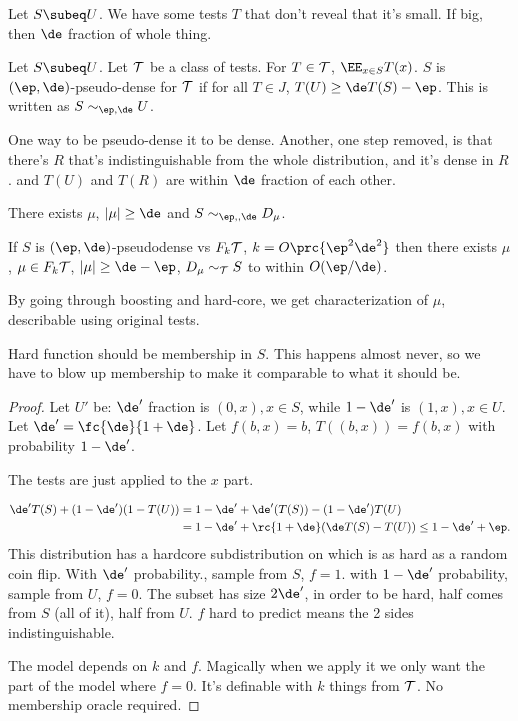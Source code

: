 Let $S\subeq U$. We have some tests $T$ that don't reveal that it's small. If big, then $\de$ fraction of whole thing.
\begin{df}
Let $S\subeq U$. Let $\cal T$ be a class of tests. For $T\in \cal T$, $\EE_{x\in S} T(x)$. 
$S$ is $(\ep,\de)$-pseudo-dense for $\cal T$ if for all $T\in J$, $T(U) \ge \de T(S) - \ep$.  This is written as $S\sim_{\ep,\de} U$.
\end{df}
One way to be pseudo-dense it to be dense. Another, one step removed,  is that there's $R$ that's indistinguishable from the whole distribution, and it's dense in $R$. and $T(U)$ and $T(R)$ are within $\de$ fraction of each other. 
\begin{thm}
There exists $\mu$, $|\mu|\ge \de$ and $S \sim_{\ep,,\de} D_\mu$. 

If $S$ is $(\ep,\de)$-pseudodense vs $F_k\cal T$, $k=O\prc{\ep^2\de^2}$ then there exists $\mu$, $\mu\in F_k\cal T$, $|\mu|\ge \de-\ep$, $D_\mu\sim_{\cal T} S$ to within $O(\ep/\de)$. 
\end{thm}
By going through boosting and hard-core, we get characterization of $\mu$, describable using original tests.

Hard function should be membership in $S$. This happens almost never, so we have to blow up membership to make it comparable to what it should be.
\begin{proof}
Let $U'$ be: $\de'$ fraction is $(0,x), x\in S$, while $1-\de'$ is $(1,x), x\in U$.  Let $\de'=\fc{\de}{1+\de}$.  Let $f(b,x)=b$, $T((b,x)) = f(b,x)$ with probability $1-\de'$.

The tests are just applied to the $x$ part. 

\begin{align}
\de' T(S) + (1-\de') (1-T(U))
&= 1-\de' + \de' (T(S)) - (1-\de') T(U)\\
&= 1-\de' + \rc{1+\de} (\de T(S) - T(U))\le 1-\de'+\ep.
\end{align}
This distribution has a hardcore subdistribution on which is as hard as a random coin flip. 
With $\de'$ probability., sample from $S$, $f=1$. with $1-\de'$ probability, sample from $U$, $f=0$.
The subset has size $2\de'$, in order to be hard, half comes from $S$ (all of it), half from $U$. $f$ hard to predict means the 2 sides indistinguishable. %

The model depends on $k$ and $f$. Magically when we apply it we only want the part of the model where $f=0$. It's definable with $k$ things from $\cal T$. No membership oracle required. 
\end{proof}